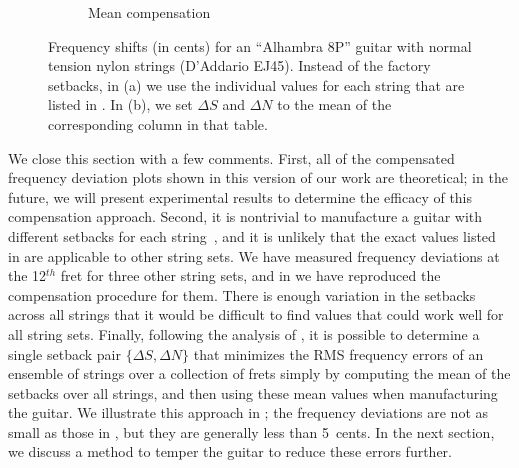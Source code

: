 \begin{figure}
\begin{subfigure}[b]{0.8\textwidth}
   \caption{Mean compensation}
   \label{fig:shift_alhambra8p_ej45_mean}
  \end{subfigure}
  \caption{\label{fig:compensation_alhambra8p_ej45} Frequency shifts (in cents) for an ``Alhambra 8P'' guitar with normal tension nylon strings (D'Addario EJ45). Instead of the factory setbacks, in (a) we use the individual values for each string that are listed in . In (b), we set $\Delta S$ and $\Delta N$ to the mean of the corresponding column in that table.}
 \end{figure}

We close this section with a few comments. First, all of the compensated frequency deviation plots shown in this version of our work are theoretical; in the future, we will present experimental results to determine the efficacy of this compensation approach. Second, it is nontrivial to manufacture a guitar with different setbacks for each string~\cite{ref:byers1996cgi}, and it is unlikely that the exact values listed in  are applicable to other string sets. We have measured frequency deviations at the 12$^{th}$ fret for three other string sets, and in  we have reproduced the compensation procedure for them. There is enough variation in the setbacks across all strings that it would be difficult to find values that could work well for all string sets. Finally, following the analysis of , it is possible to determine a single setback pair $\{\Delta S, \Delta N\}$ that minimizes the RMS frequency errors of an ensemble of strings over a collection of frets simply by computing the mean of the setbacks over all strings, and then using these mean values when manufacturing the guitar. We illustrate this approach in ; the frequency deviations are not as small as those in , but they are generally less than 5~cents. In the next section, we discuss a method to temper the guitar to reduce these errors further. 